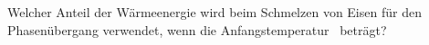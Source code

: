 Welcher Anteil der Wärmeenergie wird beim Schmelzen von Eisen für den Phasenübergang verwendet, wenn die Anfangstemperatur \TaO\ beträgt?

